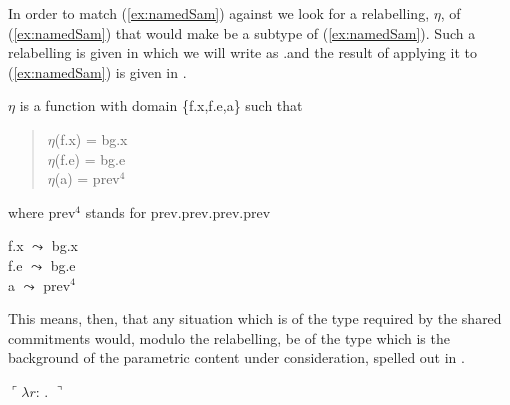 In order to match (\ref{ex:namedSam})  against \preveg{}  we look
for a relabelling, $\eta$, of (\ref{ex:namedSam}) that would make
\preveg{} be a subtype of (\ref{ex:namedSam}).  Such a
relabelling is given in  which we will write as .and the result of applying it to
(\ref{ex:namedSam}) is given in .
\begin{ex}
\begin{subex}
\item $\eta$ is a function with domain \{f.x,f.e,a\} such that
\begin{quote}
$\eta$(f.x) = bg.x\\
$\eta$(f.e) = bg.e\\
$\eta$(a) = prev$^4$
\end{quote}
where prev$^4$ stands for prev.prev.prev.prev
\item f.x $\leadsto$ bg.x\\
f.e $\leadsto$ bg.e\\
a $\leadsto$ prev$^4$
 
\item 
{}

\end{subex}
\end{ex}
This means, then, that any situation which is of the type required by
the shared commitments would, modulo the relabelling, be of the type
which is the background of the parametric content under consideration,
spelled out in \nexteg{}.
\begin{ex}
$\ulcorner\lambda
  r$: . 
$\urcorner$ 
 
\end{ex}

